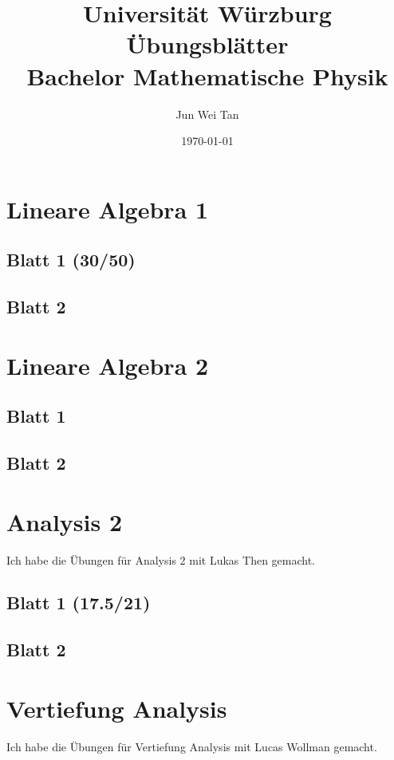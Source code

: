 \documentclass{tuftebook}
\numberwithin{Theorem}{chapter}
\theoremstyle{definition}
\theoremstyle{definition}
\begin{document}
	\title{Universit\"{a}t W\"{u}rzburg \"{U}bungsbl\"{a}tter\\Bachelor Mathematische Physik}
	\author{Jun Wei Tan}
	\date{\today}
	\maketitle
	\tableofcontents

\chapter{Lineare Algebra 1}
\section{Blatt 1 (30/50)}

\section{Blatt 2}


\chapter{Lineare Algebra 2}
\section{Blatt 1}

\section{Blatt 2}


\chapter{Analysis 2}
Ich habe die Übungen für Analysis 2 mit Lukas Then gemacht.
\section{Blatt 1 (17.5/21)}

\section{Blatt 2}


\chapter{Vertiefung Analysis}
Ich habe die Übungen für Vertiefung Analysis mit Lucas Wollman gemacht.
\end{document}

